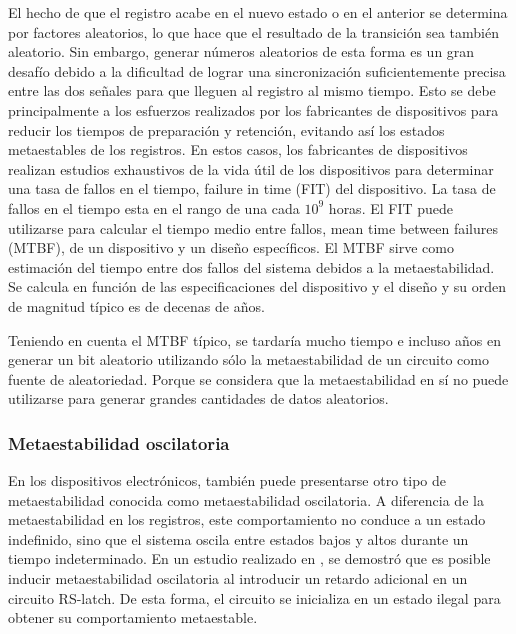                 El hecho de que el registro acabe en el nuevo estado o en el anterior se determina por factores aleatorios, lo que hace que el resultado de la transición sea también aleatorio. Sin embargo, generar números aleatorios de esta forma es un gran desafío debido a la dificultad de lograr una sincronización suficientemente precisa entre las dos señales para que lleguen al registro al mismo tiempo. Esto se debe principalmente a los esfuerzos realizados por los fabricantes de dispositivos para reducir los tiempos de preparación y retención, evitando así los estados metaestables de los registros. En estos casos, los fabricantes de dispositivos realizan estudios exhaustivos de la vida útil de los dispositivos para determinar una tasa de fallos en el tiempo, failure in time (FIT) del dispositivo. La tasa de fallos en el tiempo esta en el rango de una cada $10^{9}$ horas. El FIT puede utilizarse para calcular el tiempo medio entre fallos, mean time between failures (MTBF), de un dispositivo y un diseño específicos. El MTBF sirve como estimación del tiempo entre dos fallos del sistema debidos a la metaestabilidad. Se calcula en función de las especificaciones del dispositivo y el diseño y su orden de magnitud típico es de decenas de años.

                Teniendo en cuenta el MTBF típico, se tardaría mucho tiempo e incluso años en generar un bit aleatorio utilizando sólo la metaestabilidad de un circuito como fuente de aleatoriedad. Porque se considera que la metaestabilidad en sí no puede utilizarse para generar grandes cantidades de datos aleatorios.

            \subsubsection{Metaestabilidad oscilatoria}

                  En los dispositivos electrónicos, también puede presentarse otro tipo de metaestabilidad conocida como metaestabilidad oscilatoria. A diferencia de la metaestabilidad en los registros, este comportamiento no conduce a un estado indefinido, sino que el sistema oscila entre estados bajos y altos durante un tiempo indeterminado. En un estudio realizado en \cite{Reyneri1990}, se demostró que es posible inducir metaestabilidad oscilatoria al introducir un retardo adicional en un circuito RS-latch. De esta forma, el circuito se inicializa en un estado ilegal para obtener su comportamiento metaestable.
                        
